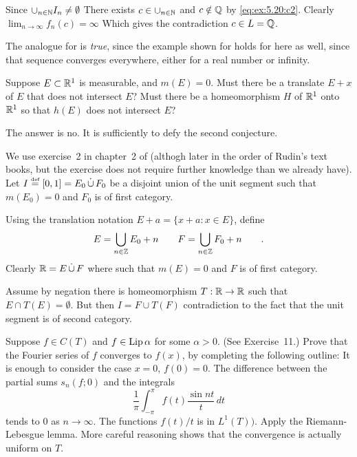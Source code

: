 \begin{enumerate}
\begin{itemize}
Since \(\cup_{n\in\mathbb{N}} I_n \neq \emptyset\) 
There exists \(c \in \cup_{n\in\mathbb{N}}\)
and \(c\notin \mathbb{Q}\) by \eqref{eq:ex:5.20:c2}.
Clearly \(\lim_{n\to\infty} f_n(c) = \infty\)
Which gives the contradiction \(c\in L=\mathbb{Q}\).


The analogue for  is \emph{true}, since the example shown
for  holds for here as well, since
that sequence converges everywhere, either for a real number
or infinity.

\end{itemize}

\begin{excopy}
Suppose \(E\subset \mathbb{R}^1\) is measurable, and \(m(E)=0\).
Must there be a translate \(E+x\) of $E$ that does not intersect $E$?
Must there be a homeomorphism $H$ of \(\mathbb{R}^1\) onto \(\mathbb{R}^1\) so that
 \(h(E)\) does not intersect $E$?
\end{excopy}

The answer is no. It is sufficiently to defy the second conjecture.

We use exercise~2 in chapter~2 of \cite{RudinFA79} 
(althogh later in the order of Rudin's text books, but the exercise
does not require further knowledge than we already have).
Let \(I \eqdef [0,1] = E_0\disjunion F_0\) 
be a disjoint union of the unit segment
such that \(m(E_0)=0\) and \(F_0\) is of first category.

Using the translation notation \(E+a = \{x+a: x\in E\}\), define
\[
E = \bigcup_{n\in\mathbb{Z}} E_0 + n \qquad
F = \bigcup_{n\in\mathbb{Z}} F_0 + n \qquad.
\]
Clearly \(\R = E \disjunion F\) where 
such that \(m(E)=0\) and $F$ is of first category.

Assume by negation there is homeomorphism \(T:\mathbb{R}\to\mathbb{R}\) 
such that \(E\cap T(E) = \emptyset\).
But then \(I = F \cup T(F)\) contradiction to the fact that
the unit segment is of second category.


\begin{excopy}
Suppose \(f\in C(T)\) and
\(f\in \mathop{\rm Lip}\nolimits\alpha\) for some \(\alpha > 0\). (See  Exercise~11.)
Prove that the Fourier series of $f$ converges to \(f(x)\),
by completing the following outline:
It is enough to consider the case \(x=0\),
\(f(0)=0\). The difference between the partial sums \(s_n(f;0)\)
and the integrals
\[ \frac{1}{\pi} \int_{-\pi}^\pi f(t)\frac{\sin nt}{t}\,dt \]
tends to $0$ as \(n\to \infty\).
The functions \(f(t)/t\) is in \(L^1(T))\).
Apply the Riemann-Lebesgue lemma. More careful reasoning shows that the
convergence is actually uniform on $T$.
\end{excopy}


\end{enumerate}
